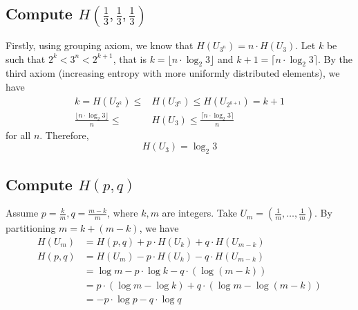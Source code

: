 \subsection{Compute $H(\frac{1}{3}, \frac{1}{3}, \frac{1}{3})$}
Firstly, using grouping axiom, we know that $H(U_{3^n}) = n \cdot H(U_3)$. Let $k$ be such that $2^k < 3^n < 2^{k+1}$, that is $k = \lfloor n \cdot \log_2 3 \rfloor$ and $k + 1 = \lceil n \cdot \log_2 3 \rceil$. By the third axiom (increasing entropy with more uniformly distributed elements), we have
\begin{align*}
    k = H(U_{2^k}) \le &H(U_{3^n}) \le H(U_{2^{k+1}}) = k + 1
    \\ \frac{\lfloor n \cdot \log_2 3 \rfloor}{n} \le &H(U_3) \le \frac{\lceil n \cdot \log_2 3 \rceil}{n}
\end{align*}
for all $n$. Therefore,
\[H(U_3) = \log_2 3\]

\subsection{Compute $H(p, q)$}
Assume $p = \frac{k}{m}, q = \frac{m-k}{m}$, where $k, m$ are integers. Take $U_m = (\frac{1}{m}, \ldots, \frac{1}{m})$. By partitioning $m = k + (m - k)$, we have
\begin{align*}
    H(U_m) &= H(p, q) + p \cdot H(U_k) + q \cdot H(U_{m-k})
    \\ H(p, q) &= H(U_m) - p \cdot H(U_k) - q \cdot H(U_{m-k})
    \\ &= \log m - p \cdot \log k - q \cdot (\log (m - k))
    \\ &= p \cdot (\log m - \log k) + q \cdot (\log m - \log (m-k))
    \\ &= - p \cdot \log p - q \cdot \log q
\end{align*}

